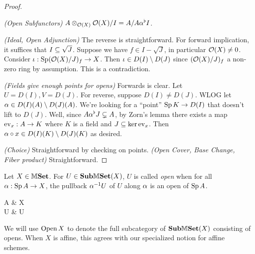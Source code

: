 \documentclass[../main.tex]{subfiles}
\begin{document}
\begin{proof}~

  \textit{(Open Subfunctors)}
  $A \otimes_{\mathcal{O}(X)} \mathcal{O}(X)/I = A/A\alpha^\flat I$.

  \textit{(Ideal, Open Adjunction)}
  The reverse is straightforward. 
  For forward implication, it suffices that $I \subseteq \sqrt{J}$.
  Suppose we have $f \in I \minus \sqrt{J}$,
  in particular $\mathcal{O}(X) \neq 0$.
  Consider $\iota : \operatorname{Sp} (\mathcal{O}(X)/J)_f \to X$.
  Then $\iota \in D(I) \setminus D(J)$ since 
  $(\mathcal{O}(X)/J)_f$ a non-zero ring by assumption.
  This is a contradiction. 

  \textit{(Fields give enough points for opens)}
  Forwards is clear. Let $U = D(I), V = D(J)$.
  For reverse, suppose $D(I) \neq D(J)$.
  WLOG let $\alpha \in D(I)(A) \setminus D(J)(A)$.
  We're looking for a ``point'' 
  $\operatorname{Sp} K \to D(I)$ that doesn't lift to $D(J)$.
  Well, since $A\alpha^\flat J \subsetneq A$, by Zorn's lemma 
  there exists a map $\operatorname{ev}_x : A \to K$ where $K$ is a field and 
  $J \subseteq \ker\operatorname{ev}_x$.
  Then $\alpha \circ x \in D(I)(K) \setminus D(J)(K)$ as desired.

  \textit{(Choice)}
  Straightforward by checking on points. 
  \textit{(Open Cover, Base Change, Fiber product)}
  Straightforward.

\end{proof}

\begin{dfn}
  
  Let $X \in \mathbb{M}\mathbf{Set}$.
  For $U \in \mathbf{Sub}\mathbb{M}\mathbf{Set}(X)$,
  $U$ is called \emph{open} when 
  for all $\alpha : \operatorname{Sp} A \to X$, the pullback $\alpha^{-1} U$ of $U$ along $\alpha$
  is an open of $\operatorname{Sp} A$.
  \begin{cd}
    \SP A \ar[r,"\al"] & X \\
    \al\inv U \ar[u] \ar[r] & U \ar[u]
  \end{cd}
  We will use $\operatorname{Open} X$ to denote the 
  full subcategory of $\mathbf{Sub}\mathbb{M}\mathbf{Set}(X)$ consisting of opens.
  When $X$ is affine, 
  this agrees with our specialized notion for affine schemes.
\end{dfn}
\end{document}
